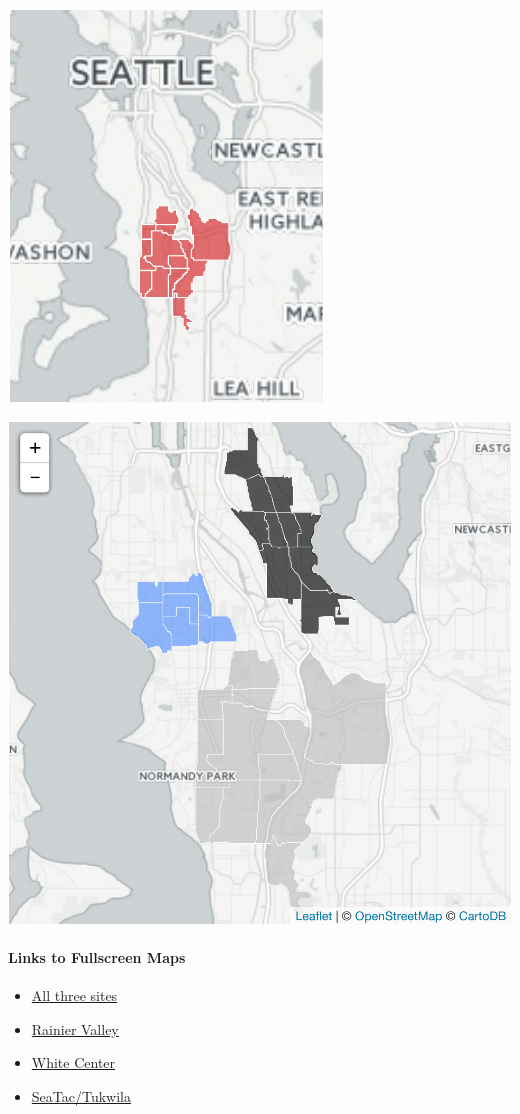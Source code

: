 \documentclass[]{article}
\providecommand{\tightlist}{%
  \setlength{\itemsep}{0pt}\setlength{\parskip}{0pt}}
\let\oldparagraph\paragraph
\renewcommand{\paragraph}[1]{\oldparagraph{#1}\mbox{}}
\begin{document}
\includegraphics{tracts_files/figure-latex/unnamed-chunk-3-3.pdf}

\begin{center}\includegraphics{tracts_files/figure-latex/unnamed-chunk-4-1} \end{center}

\paragraph{Links to Fullscreen Maps}\label{links-to-fullscreen-maps}

\begin{itemize}
\tightlist
\item
  \href{}{All three sites}
\item
  \href{}{Rainier Valley}
\item
  \href{}{White Center}
\item
  \href{}{SeaTac/Tukwila}
\end{itemize}
\end{document}
